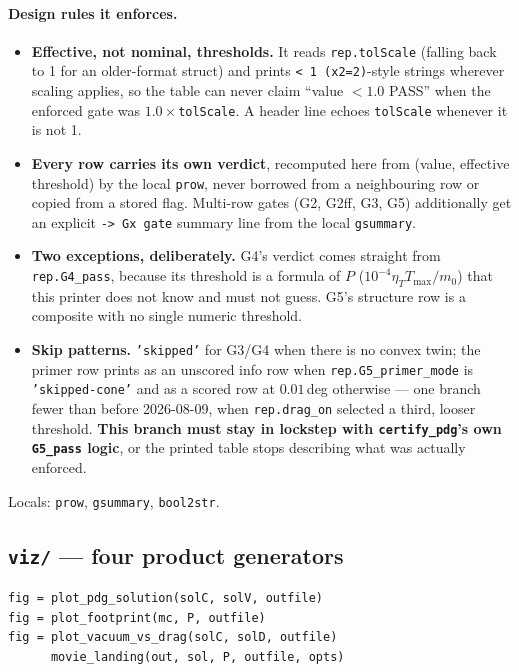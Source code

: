 \documentclass[11pt]{article}
\newcommand{\Tmax}{T_{\max}}
\newcommand{\etaT}{\eta_T}
\begin{document}
\paragraph{Design rules it enforces.}
\begin{itemize}
\item \textbf{Effective, not nominal, thresholds.} It reads
\texttt{rep.tolScale} (falling back to 1 for an older-format struct) and
prints \texttt{< 1 (x2=2)}-style strings wherever scaling applies, so the
table can never claim ``value $<1.0$ PASS'' when the enforced gate was
$1.0\times$\texttt{tolScale}. A header line echoes \texttt{tolScale}
whenever it is not 1.
\item \textbf{Every row carries its own verdict}, recomputed here from
(value, effective threshold) by the local \texttt{prow}, never borrowed from
a neighbouring row or copied from a stored flag. Multi-row gates (G2, G2ff,
G3, G5) additionally get an explicit \texttt{-> Gx gate} summary line from
the local \texttt{gsummary}.
\item \textbf{Two exceptions, deliberately.} G4's verdict comes straight
from \texttt{rep.G4\_pass}, because its threshold is a formula of $P$
($10^{-4}\etaT\Tmax/m_0$) that this printer does not know and must not
guess. G5's structure row is a composite with no single numeric threshold.
\item \textbf{Skip patterns.} \texttt{'skipped'} for G3/G4 when there is no
convex twin; the primer row prints as an unscored info row when
\texttt{rep.G5\_primer\_mode} is \texttt{'skipped-cone'} and as a scored row
at $0.01$\,deg otherwise --- one branch fewer than before 2026-08-09, when
\texttt{rep.drag\_on} selected a third, looser threshold. \textbf{This
branch must stay in lockstep with \texttt{certify\_pdg}'s own
\texttt{G5\_pass} logic}, or the printed table stops describing what was
actually enforced.
\end{itemize}

Locals: \texttt{prow}, \texttt{gsummary}, \texttt{bool2str}.

\subsection{\texttt{viz/} --- four product generators}
\label{sec:mod:viz}

\begin{verbatim}
fig = plot_pdg_solution(solC, solV, outfile)
fig = plot_footprint(mc, P, outfile)
fig = plot_vacuum_vs_drag(solC, solD, outfile)
      movie_landing(out, sol, P, outfile, opts)
\end{verbatim}
\end{document}
